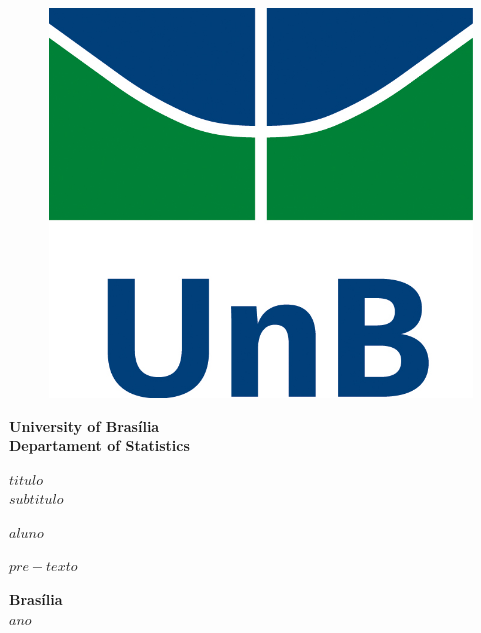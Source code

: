 \documentclass[12pt, a4paper, twoside]{article}
\numberwithin{equation}{subsection} %
\newcommand{\titulo}{$titulo$ \\ $subtitulo$}
\newcommand{\autor}{$aluno$}
\begin{document}
\begin{titlepage}
\begin{center}
\begin{figure}[h!]
	\centering
		\includegraphics[scale = 0.6]{img/as_vert_cor.jpg}
	\label{fig:unb}
\end{figure}
{\bf University of Brasília \\
\bf Departament of Statistics}
\vspace{5cm}

\setcounter{page}{0}
\null
\textbf{\titulo}
\vspace{2.5cm}


\vspace{0.2cm}
\textbf{\autor}
\end{center}
\vspace{1.5cm}

\begin{flushright}
\begin{minipage}{7.5cm}
\parbox[t]{7.5cm}{$pre-texto$}
\end{minipage}
\end{flushright}

\vspace{5cm}

\begin{center}
{\bf{Brasília} \\ }
\bf{$ano$}
\end{center}
\end{titlepage}
\end{document}
